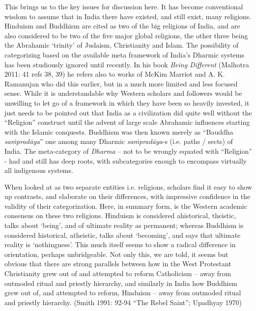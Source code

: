 This brings us to the key issues for discussion here. It has become conventional wisdom to assume that in India there have existed, and still exist, many religions. Hinduism and Buddhism are cited as two of the big religions of India, and are also considered to be two of the five major global religions, the other three being the Abrahamic ‘trinity’ of Judaism, Christianity and Islam. The possibility of categorizing based on the available meta framework of India’s Dharmic systems has been studiously ignored until recently. In his book \textit{Being Different} (Malhotra 2011: 41 refs 38, 39) he refers also to works of McKim Marriot and A. K. Ramanujan who did this earlier, but in a much more limited and less focused sense. While it is understandable why Western scholars and followers would be unwilling to let go of a framework in which they have been so heavily invested, it just needs to be pointed out that India as a civilization did quite well without the “Religion” construct until the advent of large scale Abrahamic influences starting with the Islamic conquests. Buddhism was then known merely as “Bauddha \textit{saṁpradāya}” one among many Dharmic \textit{saṁpradāya}-s (i.e. paths / sects) of India. The meta-category of \textit{Dharma} – not to be wrongly equated with “Religion” - had and still has deep roots, with subcategories enough to encompass virtually all indigenous systems.

When looked at as two separate entities i.e. religions, scholars find it easy to show up contrasts, and elaborate on their differences, with impressive confidence in the validity of their categorization. Here, in summary form, is the Western academic consensus on these two religions. Hinduism is considered ahistorical, theistic, talks about ‘being’, and of ultimate reality as permanent; whereas Buddhism is considered historical, atheistic, talks about ‘becoming’, and says that ultimate reality is ‘nothingness’. This much itself seems to show a radical difference in orientation, perhaps unbridgeable. Not only this, we are told, it seems but obvious that there are strong parallels between how in the West Protestant Christianity grew out of and attempted to reform Catholicism – away from outmoded ritual and priestly hierarchy, and similarly in India how Buddhism grew out of, and attempted to reform, Hinduism – away from outmoded ritual and priestly hierarchy. (Smith 1991: 92-94 “The Rebel Saint”; Upadhyay 1970)

